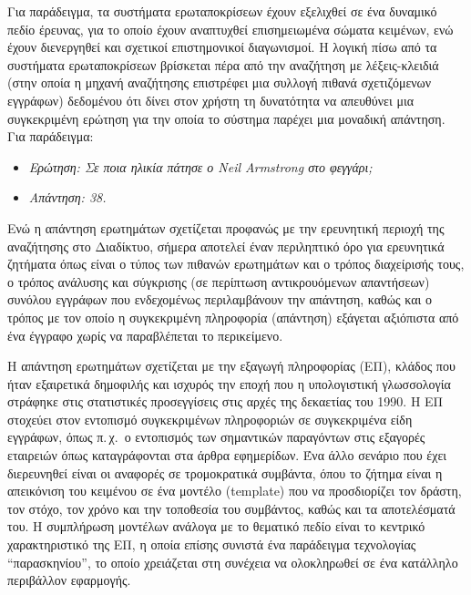 \begin{multicols}{2}

Για παράδειγμα, τα συστήματα ερωταποκρίσεων έχουν εξελιχθεί σε ένα δυναμικό πεδίο έρευνας, για το οποίο έχουν αναπτυχθεί επισημειωμένα σώματα κειμένων, ενώ έχουν διενεργηθεί και σχετικοί επιστημονικοί διαγωνισμοί. Η λογική πίσω από τα συστήματα ερωταποκρίσεων βρίσκεται πέρα από την αναζήτηση με λέξεις-κλειδιά (στην οποία η μηχανή αναζήτησης επιστρέφει μια συλλογή πιθανά σχετιζόμενων εγγράφων) δεδομένου ότι δίνει στον χρήστη τη δυνατότητα να απευθύνει μια συγκεκριμένη ερώτηση για την οποία το σύστημα παρέχει μια μοναδική απάντηση. Για παράδειγμα:

\begin{itemize}
\item[] \textit{Ερώτηση: Σε ποια ηλικία πάτησε ο Neil Armstrong στο φεγγάρι;}
\item[] \textit{Απάντηση: 38.}
\end{itemize}

Ενώ η απάντηση ερωτημάτων σχετίζεται προφανώς με την ερευνητική περιοχή της αναζήτησης στο Διαδίκτυο, σήμερα αποτελεί έναν περιληπτικό όρο για ερευνητικά ζητήματα όπως είναι ο τύπος των πιθανών ερωτημάτων και ο τρόπος διαχείρισής τους, ο τρόπος ανάλυσης και σύγκρισης (σε περίπτωση αντικρουόμενων απαντήσεων) συνόλου εγγράφων που ενδεχομένως περιλαμβάνουν την απάντηση, καθώς και ο τρόπος με τον οποίο η συγκεκριμένη πληροφορία (απάντηση) εξάγεται αξιόπιστα από ένα έγγραφο χωρίς να παραβλέπεται το περικείμενο. 

Η απάντηση ερωτημάτων σχετίζεται με την εξαγωγή πληροφορίας (ΕΠ), κλάδος που ήταν εξαιρετικά δημοφιλής και ισχυρός την εποχή που η υπολογιστική γλωσσολογία στράφηκε στις στατιστικές προσεγγίσεις στις αρχές της δεκαετίας του 1990. Η ΕΠ στοχεύει στον εντοπισμό συγκεκριμένων πληροφοριών σε συγκεκριμένα είδη εγγράφων, όπως π.\,χ.~ο εντοπισμός των σημαντικών παραγόντων  στις εξαγορές εταιρειών όπως καταγράφονται στα άρθρα εφημερίδων. Ένα άλλο σενάριο που έχει διερευνηθεί είναι οι αναφορές σε τρομοκρατικά συμβάντα, όπου το ζήτημα είναι η απεικόνιση του κειμένου σε ένα μοντέλο (template) που να προσδιορίζει τον δράστη, τον στόχο, τον χρόνο και την τοποθεσία του συμβάντος, καθώς και τα αποτελέσματά του. Η συμπλήρωση μοντέλων ανάλογα με το θεματικό πεδίο είναι το κεντρικό χαρακτηριστικό της EΠ, η οποία επίσης συνιστά ένα παράδειγμα τεχνολογίας ``παρασκηνίου'', το οποίο χρειάζεται στη συνέχεια να ολοκληρωθεί σε ένα κατάλληλο περιβάλλον εφαρμογής. 


\end{multicols}

